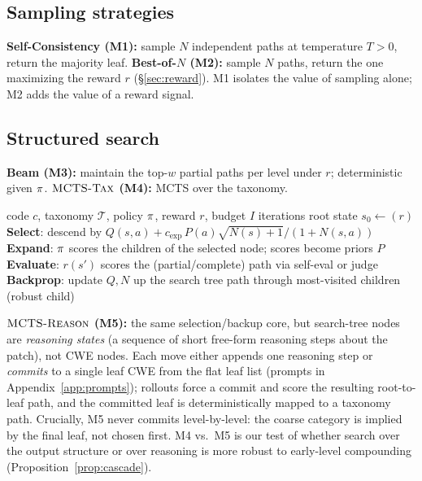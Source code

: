 \subsection{Sampling strategies}
\textbf{Self-Consistency (M1):} sample $N$ independent paths at temperature
$T>0$, return the majority leaf. \textbf{Best-of-$N$ (M2):} sample $N$ paths,
return the one maximizing the reward $r$ (\S\ref{sec:reward}). M1 isolates the
value of sampling alone; M2 adds the value of a reward signal.

\subsection{Structured search}
\textbf{Beam (M3):} maintain the top-$w$ partial paths per level under $r$;
deterministic given $\pi$. \textbf{$\mctstax$ (M4):} MCTS over the taxonomy.

\begin{algorithm}[t]
\caption{$\mctstax$: MCTS over the CWE taxonomy}
\label{alg:mcts}
\begin{algorithmic}[1]
\Require code $c$, taxonomy $\mathcal{T}$, policy $\pi$, reward $r$, budget $I$ iterations
\State root state $s_0 \gets (r)$ 
  \State \textbf{Select}: descend by $Q(s,a) + c_{\text{exp}} \, P(a)\sqrt{N(s)+1}/(1+N(s,a))$ 
  \State \textbf{Expand}: $\pi$ scores the children of the selected node; scores become priors $P$
  \State \textbf{Evaluate}: $r(s')$ scores the (partial/complete) path via self-eval or judge
  \State \textbf{Backprop}: update $Q,N$ up the search tree
\EndFor
\State \Return path through most-visited children (robust child)
\end{algorithmic}
\end{algorithm}

\textbf{$\textsc{MCTS-Reason}$ (M5):} the same selection/backup core, but search-tree nodes
are \emph{reasoning states} (a sequence of short free-form reasoning steps about
the patch), not CWE nodes. Each move either appends one reasoning step or
\emph{commits} to a single leaf CWE from the flat leaf list (prompts in
Appendix~\ref{app:prompts}); rollouts force a commit and score the resulting
root-to-leaf path, and the committed leaf is deterministically mapped to a
taxonomy path. Crucially, M5 never commits level-by-level: the coarse category is
implied by the final leaf, not chosen first. M4 vs.\ M5 is our test of whether
search over the output structure or over reasoning is more robust to early-level
compounding (Proposition~\ref{prop:cascade}).

